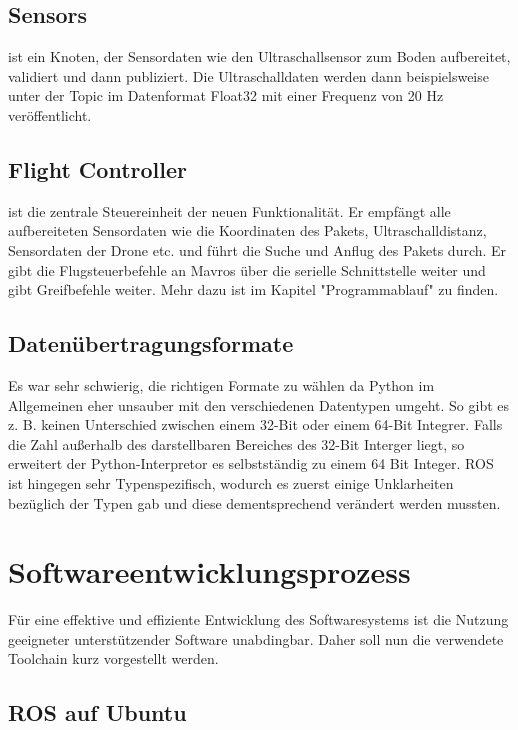 \subsection{Sensors} ist ein Knoten, der Sensordaten wie den Ultraschallsensor zum Boden aufbereitet, validiert und dann publiziert. Die Ultraschalldaten werden dann beispielsweise unter der Topic  im Datenformat Float32 mit einer Frequenz von 20 Hz veröffentlicht.
\subsection{Flight Controller} ist die zentrale Steuereinheit der neuen Funktionalität. Er empfängt alle aufbereiteten Sensordaten wie die Koordinaten des Pakets, Ultraschalldistanz, Sensordaten der Drone etc. und führt die Suche und Anflug des Pakets durch. Er gibt die Flugsteuerbefehle an Mavros über die serielle Schnittstelle weiter und gibt Greifbefehle weiter. Mehr dazu ist im Kapitel "Programmablauf" zu finden. 

\subsection{Datenübertragungsformate}
Es war sehr schwierig, die richtigen Formate zu w\"ahlen da Python im Allgemeinen eher unsauber mit den verschiedenen Datentypen umgeht. So gibt es z. B. keinen Unterschied zwischen einem 32-Bit oder einem 64-Bit Integrer. Falls die Zahl außerhalb des darstellbaren Bereiches des 32-Bit Interger liegt, so erweitert der Python-Interpretor es selbstständig zu einem 64 Bit Integer. ROS ist hingegen sehr Typenspezifisch, wodurch es zuerst einige Unklarheiten bezüglich der Typen gab und diese dementsprechend verändert werden mussten.\\


\section{Softwareentwicklungsprozess}
Für eine effektive und effiziente Entwicklung des Softwaresystems ist die Nutzung geeigneter unterstützender Software unabdingbar. Daher soll nun die verwendete Toolchain kurz vorgestellt werden.
\subsection{ROS auf Ubuntu}
